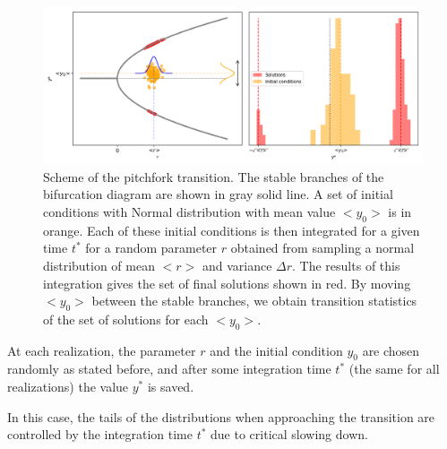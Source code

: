 \begin{figure}[H]
	\centering
	\includegraphics[width=\linewidth]{Images/Metrics/pitchfork_explanation.png}
	\caption{Scheme of the pitchfork transition. The stable branches of the bifurcation diagram are shown in gray solid line. A set of initial conditions with Normal distribution with mean value $<y_0>$ is in orange. Each of these initial conditions is then integrated for a given time $t^*$ for a random parameter $r$ obtained from sampling a normal distribution of mean $<\!r\!>$ and variance $\Delta r$. 
		The results of this integration gives the set of final solutions shown in red. 
		By moving $<\!y_0\!>$ between the stable branches, we obtain transition statistics of the set of solutions for each $<\!y_0\!>$.}
	\label{fig:pitch-explanation}
\end{figure}

At each realization, the parameter $r$ and the initial condition $y_0$ are chosen randomly as stated before, and after some integration time $t^*$ (the same for all realizations) the value $y^*$ is saved. 

In this case, the tails of the distributions when approaching the transition are controlled by the integration time $t^*$ due to critical slowing down. 

